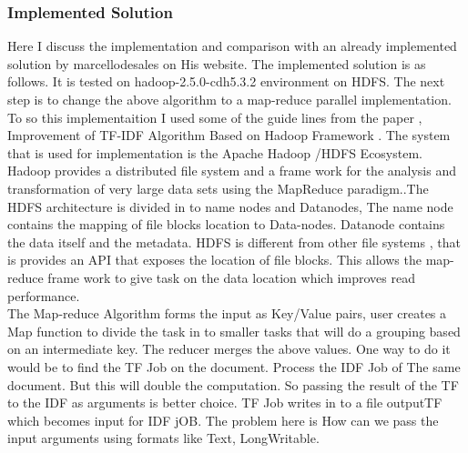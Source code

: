 \documentclass{bigdata}
\begin{document}
\subsubsection{Implemented Solution}
Here I discuss the implementation and comparison with an already implemented solution by marcellodesales on His website. The implemented solution is as follows. It is tested on hadoop-2.5.0-cdh5.3.2 environment on HDFS. The next step is to change the above algorithm to a map-reduce parallel implementation. To so this implementaition I used some of the guide lines from the paper , Improvement of TF-IDF Algorithm Based on Hadoop Framework \cite{a}. The system that is used  for implementation is the Apache Hadoop /HDFS Ecosystem. Hadoop provides a distributed file system and a frame work for the analysis and transformation of very large data sets using the MapReduce paradigm.\cite{d}.The HDFS architecture is divided in to name nodes and Datanodes, The name node contains the mapping of file blocks location to Data-nodes. Datanode contains the data itself and the metadata. HDFS is different from other file systems  , that is provides an API that exposes the location of file blocks. This allows the map-reduce frame work to give task on the data location which improves read performance.\\

The Map-reduce Algorithm forms the input as Key/Value pairs, user creates a Map function to divide the task in to smaller tasks that will do a grouping based on an intermediate key. The reducer merges the above values. One way to do it would be to find the TF Job on the document. Process the IDF Job of The same document. But this will double the computation. So passing the result of the TF to the IDF as arguments is better choice. TF Job writes in to a file outputTF which becomes input for IDF jOB. The problem here is How can we pass the input arguments using formats like Text, LongWritable. \\
\end{document}
